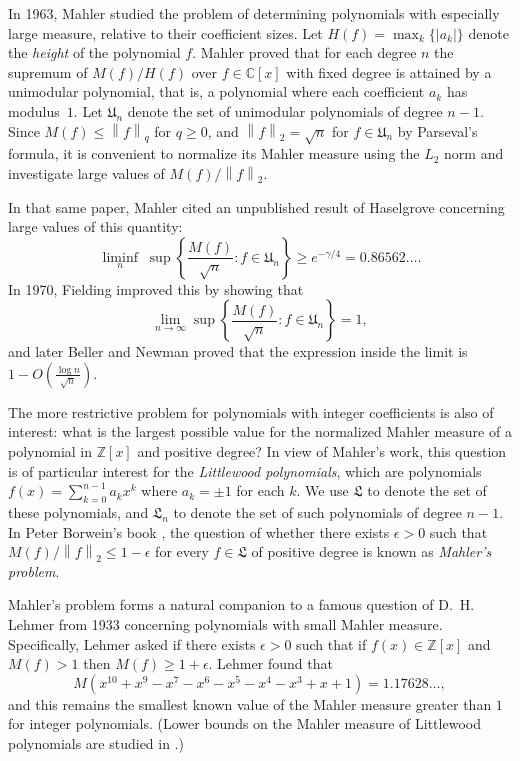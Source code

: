 \documentclass[reqno]{amsart}
\numberwithin{equation}{section}
\numberwithin{table}{section}
\numberwithin{figure}{section}
\newcommand{\abs}[1]{\left\lvert#1\right\rvert}
\newcommand{\dbars}[1]{\left\lVert#1\right\rVert}
\newcommand{\unimodular}[0]{\mathfrak{U}}
\newcommand{\littlewood}[0]{\mathfrak{L}}
\begin{document}
In 1963, Mahler \cite{Mahler63} studied the problem of determining polynomials with especially large measure, relative to their coefficient sizes.
Let $H(f)=\max_k \{\abs{a_k}\}$ denote the \textit{height} of the polynomial $f$.
Mahler proved that for each degree $n$ the supremum of $M(f)/H(f)$ over $f\in\mathbb{C}[x]$ with fixed degree is attained by a unimodular polynomial, that is, a polynomial where each coefficient $a_k$ has modulus~$1$. 
Let $\unimodular_n$ denote the set of unimodular polynomials of degree $n-1$.
Since $M(f)\leq \dbars{f}_q$ for $q\geq0$, and $\dbars{f}_2=\sqrt{n}$ for $f\in\unimodular_n$ by Parseval's formula, it is convenient to normalize its Mahler measure using the $L_2$ norm and investigate large values of $M(f)/\dbars{f}_2$.

In that same paper, Mahler cited an unpublished result of Haselgrove concerning large values of this quantity:
\[
\liminf_{n} \; \sup \left\{\frac{M(f)}{\sqrt{n}} : f\in\unimodular_n\right\}
\geq e^{-\gamma/4} = 0.86562\ldots.
\]
In 1970, Fielding \cite{Fielding70} improved this by showing that
\[
\lim_{n\to\infty} \sup \left\{\frac{M(f)}{\sqrt{n}} : f\in\unimodular_n\right\} = 1,
\]
and later Beller and Newman \cite{BN73} proved that the expression inside the limit is $1-O(\frac{\log n}{\sqrt{n}})$.

The more restrictive problem for polynomials with integer coefficients is also of interest: what is the largest possible value for the normalized Mahler measure of a polynomial in $\mathbb{Z}[x]$ and positive degree?
In view of Mahler's work, this question is of particular interest for the \textit{Littlewood polynomials}, which are polynomials $f(x)=\sum_{k=0}^{n-1} a_k x^k$ where $a_k=\pm1$ for each $k$.
We use $\littlewood$ to denote the set of these polynomials, and $\littlewood_n$ to denote the set of such polynomials of degree $n-1$.
In Peter Borwein's book \cite[Problem P10]{Borwein02}, the question of whether there exists $\epsilon>0$ such that $M(f)/\dbars{f}_2\leq1-\epsilon$ for every $f\in\littlewood$ of positive degree is known as \textit{Mahler's problem}.

Mahler's problem forms a natural companion to a famous question of D.~H. Lehmer from 1933 \cite{Lehmer33} concerning polynomials with small Mahler measure.
Specifically, Lehmer asked if there exists $\epsilon>0$ such that if $f(x)\in\mathbb{Z}[x]$ and $M(f)>1$ then $M(f)\geq1+\epsilon$.
Lehmer found that
\[
M\left(x^{10}+x^9-x^7-x^6-x^5-x^4-x^3+x+1\right) = 1.17628\ldots,
\]
and this remains the smallest known value of the Mahler measure greater than $1$ for integer polynomials.
(Lower bounds on the Mahler measure of Littlewood polynomials are studied in .)
\end{document}
